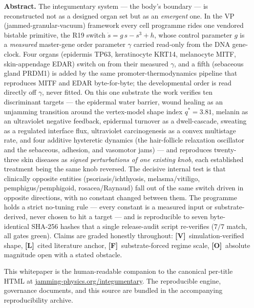 \documentclass[11pt,a4paper]{article}
\newcommand{\V}{\textcolor{gV}{\textbf{[V]}}}
\newcommand{\Lg}{\textcolor{gL}{\textbf{[L]}}}
\newcommand{\Fg}{\textcolor{gF}{\textbf{[F]}}}
\newcommand{\Og}{\textcolor{gO}{\textbf{[O]}}}
\begin{document}
\begin{titlepage}
\vspace{1.6em}
\begin{minipage}{0.9\textwidth}\small
\textbf{Abstract.} The integumentary system --- the body's boundary --- is reconstructed not as a designed
organ set but as an \emph{emergent} one. In the VP (jammed-granular-vacuum) framework every cell programme rides one
vendored bistable primitive, the R19 switch $\dot s = g\,s - s^{3} + h$, whose control parameter $g$ is a
\emph{measured} master-gene order parameter $\gamma$ carried read-only from the DNA gene-clock. Four organs
(epidermis TP63, keratinocyte KRT14, melanocyte MITF, skin-appendage EDAR) switch on from their measured $\gamma$,
and a fifth (sebaceous gland PRDM1) is added by the same promoter-thermodynamics pipeline that reproduces MITF
and EDAR byte-for-byte; the developmental order is read directly off $\gamma$, never fitted. On this one substrate
the work verifies ten discriminant targets --- the epidermal water barrier, wound healing as an unjamming
transition around the vertex-model shape index $q^{*}=3.81$, melanin as an ultraviolet negative feedback, epidermal
turnover as a dwell-cascade, sweating as a regulated interface flux, ultraviolet carcinogenesis as a convex
multistage rate, and four additive hysteretic dynamics (the hair-follicle relaxation oscillator and the sebaceous,
adhesion, and vasomotor jams) --- and reproduces twenty-three skin diseases as \emph{signed perturbations of one
existing knob}, each established treatment being the same knob reversed. The decisive internal test is that
clinically opposite entities (psoriasis/ichthyosis, melasma/vitiligo, pemphigus/pemphigoid, rosacea/Raynaud)
fall out of the same switch driven in opposite directions, with no constant changed between them. The programme
holds a strict no-tuning rule --- every constant is a measured input or substrate-derived, never chosen to hit a
target --- and is reproducible to seven byte-identical SHA-256 hashes that a single release-audit script re-verifies
($7/7$ match, all gates green). Claims are graded honestly throughout: \V\ simulation-verified shape, \Lg\ cited
literature anchor, \Fg\ substrate-forced regime scale, \Og\ absolute magnitude open with a stated obstacle.
\end{minipage}

\vfill
{\footnotesize This whitepaper is the human-readable companion to the canonical per-title HTML at
\href{https://jamming-physics.org/integumentary/}{jamming-physics.org/integumentary}. The reproducible engine,
governance documents, and this source are bundled in the accompanying reproducibility archive.\par}
\end{titlepage}
\end{document}
